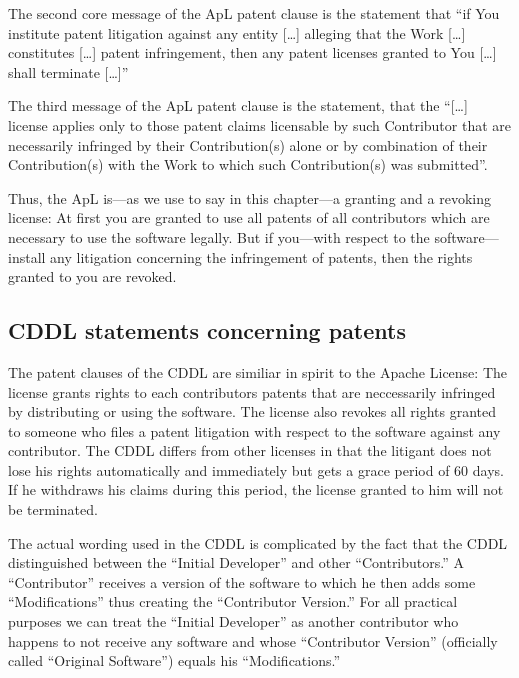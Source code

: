 The second core message of the ApL patent clause is the statement that
\enquote{if You institute patent litigation against any entity [\ldots] alleging
that the Work [\ldots] constitutes [\ldots] patent infringement, then any patent
licenses granted to You [\ldots] shall terminate [\ldots]}

The third message of the ApL patent clause is the statement, that the
\enquote{[\ldots] license applies only to those patent claims licensable by such
Contributor that are necessarily infringed by their Contribution(s) alone or by
combination of their Contribution(s) with the Work to which such Contribution(s)
was submitted}.

Thus, the ApL is---as we use to say in this chapter---a granting and a
revoking license: At first you are granted to use all patents of all
contributors which are necessary to use the software legally. But if you---with
respect to the software---install any litigation concerning the infringement of
patents, then the rights granted to you are revoked.

\subsection{CDDL statements concerning patents}

The patent clauses of the CDDL are similiar in spirit to the Apache License: 
The license grants rights to each contributors patents that are neccessarily
infringed by distributing or using the software. The license also revokes all
rights granted to someone who files a patent litigation with respect to the
software against any contributor.  The CDDL differs from other licenses in that
the litigant does not lose his rights automatically and immediately but gets a
grace period of 60 days. If he withdraws his claims during this period, the
license granted to him will not be terminated.

The actual wording used in the CDDL is complicated by the fact that the CDDL
distinguished between the \enquote{Initial Developer} and other
\enquote{Contributors.}  A \enquote{Contributor} receives a version of the
software to which he then adds some \enquote{Modifications} thus creating the
\enquote{Contributor Version.} For all practical purposes we can treat the
\enquote{Initial Developer} as another contributor who happens to not receive
any software and whose \enquote{Contributor Version} (officially called
\enquote{Original Software}) equals his \enquote{Modifications.}

